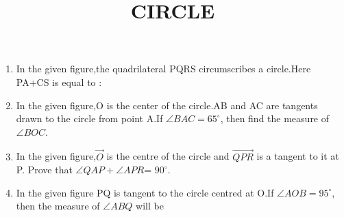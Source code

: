 \documentclass[12pt,A4 paper]{article}
\begin{document}
\title{\textbf{CIRCLE}}
\date{}
\maketitle

\begin{enumerate}
\item In the given figure,the quadrilateral PQRS circumscribes a circle.Here PA+CS is equal to : \\

\begin{figure}[h]
	        \centering
		
		\caption{}
		\label{fig:1}
\end{figure}



 \begin{figure}[h]
	        \centering
	        
 \end{figure}




\item In the given figure,O is the center of the circle.AB and AC are tangents drawn to the circle from point A.If $\angle BAC=65^{\circ}$, then find the measure of $\angle BOC$.\\


	\begin{center}
\begin{figure}[h]
	        \centering
	        
		\caption{}
		\label{fig 2}
        \end{figure}
	\end{center}


\pagebreak

\item In the given figure,$\vec{ O}$ is the centre of the circle and $\overrightarrow {QPR}$ is a tangent to it at P. Prove that $\angle QAP+ \angle APR$= $90^{\circ}$.\\
\begin{figure}[h]
	        \centering
	        
		\caption{}
		\label{fig:3}

        \end{figure}


\item In the given figure PQ is tangent to the circle centred at O.If $\angle AOB= 95^{\circ}$, then the measure of $\angle ABQ$ will be


\begin{figure}[h]
	        \centering
	        
		\caption{}
		\label{fig:4}
        \end{figure}



\end{enumerate}
\end{document}
